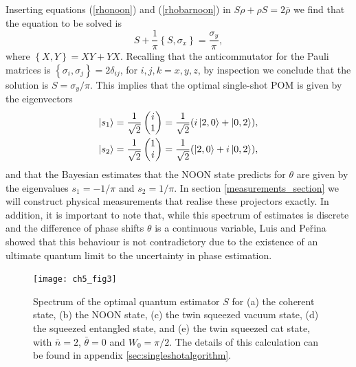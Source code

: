 Inserting equations (\ref{rhonoon}) and (\ref{rhobarnoon}) in $S \rho + \rho S = 2 \bar{\rho}$ we find that the equation to be solved is 
\begin{equation}
S + \frac{1}{\pi}\left\lbrace S, \sigma_x \right\rbrace = \frac{\sigma_y}{\pi},
\end{equation}
where $\left\lbrace X, Y \right\rbrace = X Y + Y X$. Recalling that the anticommutator for the Pauli matrices is $\left\lbrace \sigma_i, \sigma_j \right\rbrace = 2\delta_{ij}$, for $i, j, k = x, y, z$, by inspection we conclude that the solution is $S = \sigma_y/\pi$. This implies that the optimal single-shot POM is given by the eigenvectors
\begin{align}
\ket{s_1} &= \frac{1}{\sqrt{2}} 
\begin{pmatrix} 
i  \\
1  
\end{pmatrix} = \frac{1}{\sqrt{2}} (i\ket{2,0}+\ket{0,2}), 
\nonumber \\
\ket{s_2} &= \frac{1}{\sqrt{2}}
\begin{pmatrix} 
1 \\
i 
\end{pmatrix} = \frac{1}{\sqrt{2}} (\ket{2,0}+i\ket{0,2}),
\label{noon_projectors}
\end{align}
and that the Bayesian estimates that the NOON state predicts for $\theta$ are given by the eigenvalues $s_1=-1/\pi$ and $s_2=1/\pi$. In section \ref{measurements_section} we will construct physical measurements that realise these projectors exactly. In addition, it is important to note that, while this spectrum of estimates is discrete and the difference of phase shifts $\theta$ is a continuous variable, Luis and Pe{\v{r}}ina \cite{alfredo1996} showed that this behaviour is not contradictory due to the existence of an ultimate quantum limit to the uncertainty in phase estimation.

\begin{figure}[t]
\centering
\texttt{[image: ch5\_fig3]}
	\caption[Spectra of the optimal quantum estimators]{Spectrum of the optimal quantum estimator $S$ for (a) the coherent state, (b) the NOON state, (c) the twin squeezed vacuum state, (d) the squeezed entangled state, and (e) the twin squeezed cat state, with $\bar{n}=2$, $\bar{\theta} = 0$ and $W_0 = \pi/2$. The details of this calculation can be found in appendix \ref{sec:singleshotalgorithm}.}
\label{bayes_spectra}
\end{figure}

